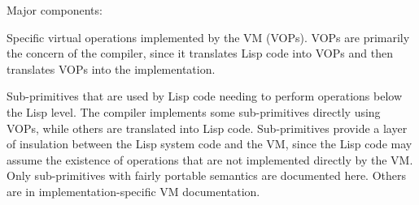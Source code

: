 \begin{comment}
Things the VM won't do:

The VM specification does not totally solve the problem of porting \ccl, since
it is inevitable that it will not map cleanly to all possible combinations of
hardware and operating systems.  The VM should not be regarded as being cast in
concrete, since changes in many characteristics would only affect a tiny
fraction of the system sources.

One current major problem with porting is that large pieces of functionality
are entirely within the VM, and would need to be reimplemented for each port.
A major goal for future work on the system is moving code out of the VM, both
by supporting a "fast-call" convention that allows reasonable use of Lisp in
the out of line implementation of VOPs, and by having a "bugout" mechanism that
allows the VM to call Lisp functions to implement the hard cases in some VOPs.

The VM is designed to support conventional, untagged, general register
architectures.  Suitably lobotomized, it could be mapped to less flexible
hardware such as "Lisp machines", but the compiler would have serious
difficulties supporting stack architectures.

The VM does not support concurrent lightweight processes.  Locking primitives
and deep-binding of specials would be needed.

The VM does not deal with operating systems interface issues at all.  A minimal
port would require implementing at least file and terminal I/O streams.  \ccl
implements system interfaces using Aliens and other facilities built on top of
them.

\end{comment}



Major components:
\begin{itemize}
Specific virtual operations implemented by the VM (VOPs).  VOPs are primarily
the concern of the compiler, since it translates Lisp code into VOPs and then
translates VOPs into the implementation.

Sub-primitives that are used by Lisp code needing to perform operations
below the Lisp level.  The compiler implements some sub-primitives directly
using VOPs, while others are translated into Lisp code.  Sub-primitives provide
a layer of insulation between the Lisp system code and the VM, since the Lisp
code may assume the existence of operations that are not implemented directly
by the VM.  Only sub-primitives with fairly portable semantics are documented
here.  Others are in implementation-specific VM documentation.
\end{itemize}

